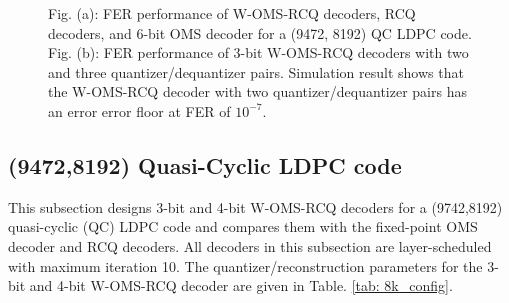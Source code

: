 \documentclass [PhD] {uclathes}
\begin{document}
\begin{figure}[t] 
    \centering
    \hfill
  \caption{Fig. (a): FER performance of W-OMS-RCQ decoders, RCQ decoders, and 6-bit OMS decoder for a (9472, 8192) QC LDPC code. Fig. (b): FER performance of 3-bit W-OMS-RCQ decoders with two and three quantizer/dequantizer pairs. Simulation result shows that the W-OMS-RCQ decoder with two quantizer/dequantizer pairs has an error error floor at FER of $10^{-7}$. }
\end{figure}



\subsection{(9472,8192) Quasi-Cyclic LDPC code}
This subsection designs 3-bit and 4-bit W-OMS-RCQ decoders  for a (9742,8192) quasi-cyclic (QC) LDPC code  and compares them with the fixed-point OMS decoder and RCQ decoders. All decoders in this subsection are layer-scheduled with maximum iteration 10. The quantizer/reconstruction parameters for the 3-bit and 4-bit W-OMS-RCQ decoder are given in Table. \ref{tab: 8k_config}.
\end{document}
